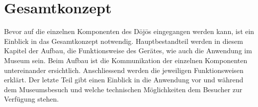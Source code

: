 \section{Gesamtkonzept}\label{sec:gesamtkonzept}
Bevor auf die einzelnen Komponenten des Dōjōs eingegangen werden kann, ist ein Einblick in das Gesamtkonzept notwendig. Hauptbestandteil werden in diesem Kapitel der Aufbau, die Funktionsweise des Gerätes, wie auch die Anwendung im Museum sein. Beim Aufbau ist die Kommunikation der einzelnen Komponenten untereinander ersichtlich. Anschliessend werden die jeweiligen Funktionsweisen erklärt. Der letzte Teil gibt einen Einblick in die Anwendung vor und während dem Museumsbesuch und welche technischen Möglichkeiten dem Besucher zur Verfügung stehen.